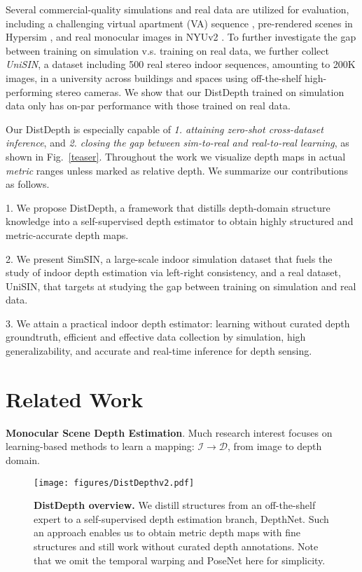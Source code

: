 \documentclass[10pt,twocolumn,letterpaper]{article}
\begin{document}
Several commercial-quality simulations and real data are utilized for evaluation, including a challenging virtual apartment (VA) sequence \cite{UE4Environment, UnrealEngine4}, pre-rendered scenes in Hypersim \cite{roberts2020hypersim}, and real monocular images in NYUv2 \cite{silberman2012indoor}. To further investigate the gap between training on simulation v.s. training on real data, we further collect \textit{UniSIN}, a dataset including 500 real stereo indoor sequences, amounting to 200K images, in a university across buildings and spaces using off-the-shelf high-performing stereo cameras. We show that our DistDepth trained on simulation data only has on-par performance with those trained on real data. 

Our DistDepth is especially capable of \textit{1. attaining zero-shot cross-dataset inference}, and \textit{2. closing the gap between sim-to-real and real-to-real learning}, as shown in Fig.~\ref{teaser}. Throughout the work we visualize depth maps in actual \textit{metric} ranges unless marked as relative depth.
We summarize our contributions as follows.

1. We propose DistDepth, a framework that distills depth-domain structure knowledge into a self-supervised depth estimator to obtain highly structured and metric-accurate depth maps. 

2. We present SimSIN, a large-scale indoor simulation dataset that fuels the study of indoor depth estimation via left-right consistency, and a real dataset, UniSIN, that targets at studying the gap between training on simulation and real data.


3. We attain a practical indoor depth estimator: learning without curated depth groundtruth, efficient and effective data collection by simulation, high generalizability, and accurate and real-time inference for depth sensing. 

\section{Related Work}
\label{sec:related}
\textbf{Monocular Scene Depth Estimation}. Much research interest focuses on learning-based methods to learn a mapping: $\mathcal{I}\to \mathcal{D}$, from image to depth domain. 

\begin{figure*}[hbt]
    \centering
    \texttt{[image: figures/DistDepthv2.pdf]}
    \vspace{-8pt}
    \caption{\textbf{DistDepth overview.} We distill structures from an off-the-shelf expert to a self-supervised depth estimation branch, DepthNet. Such an approach enables us to obtain metric depth maps with fine structures and still work without curated depth annotations. Note that we omit the temporal warping and PoseNet here for simplicity.}
    \vspace{-13pt}
    \label{distdepth}
\end{figure*}
\end{document}
